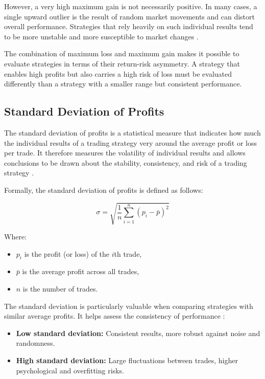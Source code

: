 However, a very high maximum gain is not necessarily positive.
In many cases, a single upward outlier is the result of random market movements and can distort overall performance.
Strategies that rely heavily on such individual results tend to be more unstable and more susceptible to market changes \cite{max-gain}.

The combination of maximum loss and maximum gain makes it possible to evaluate strategies in terms of their return-risk asymmetry.
A strategy that enables high profits but also carries a high risk of loss must be evaluated differently than a strategy with a smaller range but consistent performance.

\subsection{Standard Deviation of Profits}

The standard deviation of profits is a statistical measure that indicates how much the individual results of a trading strategy very around the average profit or loss per trade.
It therefore measures the volatility of individual results and allows conclusions to be drawn about the stability, consistency, and risk of a trading strategy \cite{std}.

Formally, the standard deviation of profits is defined as follows:

\[
    \sigma = \sqrt{\frac{1}{n} \sum_{i=1}^n (p_i - \bar{p})^2}
\]

\noindent
Where:

\begin{itemize}
    \item \(p_i\) is the profit (or loss) of the \(i\)th trade,
    \item \(\bar{p}\) is the average profit across all trades,
    \item \(n\) is the number of trades.
\end{itemize}

\noindent
The standard deviation is particularly valuable when comparing strategies with similar average profits.
It helps assess the consistency of performance \cite{std}:

\begin{itemize}
    \item \textbf{Low standard deviation:} Consistent results, more robust against noise and randomness.
    \item \textbf{High standard deviation:} Large fluctuations between trades, higher psychological and overfitting risks.
\end{itemize}

